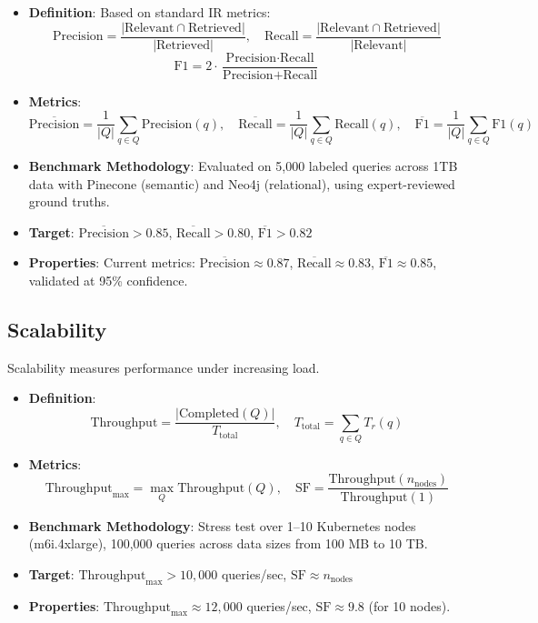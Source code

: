 \documentclass[11pt]{article}
\begin{document}
\begin{itemize}
    \item \textbf{Definition}: Based on standard IR metrics:
        \[
        \text{Precision} = \frac{|\text{Relevant} \cap \text{Retrieved}|}{|\text{Retrieved}|}, \quad
        \text{Recall} = \frac{|\text{Relevant} \cap \text{Retrieved}|}{|\text{Relevant}|}
        \]
        \[
        \text{F1} = 2 \cdot \frac{\text{Precision} \cdot \text{Recall}}{\text{Precision} + \text{Recall}}
        \]

    \item \textbf{Metrics}:
        \[
        \overline{\text{Precision}} = \frac{1}{|Q|} \sum_{q \in Q} \text{Precision}(q), \quad
        \overline{\text{Recall}} = \frac{1}{|Q|} \sum_{q \in Q} \text{Recall}(q), \quad
        \overline{\text{F1}} = \frac{1}{|Q|} \sum_{q \in Q} \text{F1}(q)
        \]

    \item \textbf{Benchmark Methodology}: Evaluated on 5,000 labeled queries across 1TB data with Pinecone (semantic) and Neo4j (relational), using expert-reviewed ground truths.

    \item \textbf{Target}: $\overline{\text{Precision}} > 0.85$, $\overline{\text{Recall}} > 0.80$, $\overline{\text{F1}} > 0.82$

    \item \textbf{Properties}: Current metrics: $\overline{\text{Precision}} \approx 0.87$, $\overline{\text{Recall}} \approx 0.83$, $\overline{\text{F1}} \approx 0.85$, validated at 95\% confidence.
\end{itemize}

\subsection{Scalability}
\label{subsec:scalability}

Scalability measures performance under increasing load.

\begin{itemize}
    \item \textbf{Definition}:
        \[
        \text{Throughput} = \frac{|\text{Completed}(Q)|}{T_{\text{total}}}, \quad
        T_{\text{total}} = \sum_{q \in Q} T_r(q)
        \]

    \item \textbf{Metrics}:
        \[
        \text{Throughput}_{\text{max}} = \max_Q \text{Throughput}(Q), \quad
        \text{SF} = \frac{\text{Throughput}(n_{\text{nodes}})}{\text{Throughput}(1)}
        \]

    \item \textbf{Benchmark Methodology}: Stress test over 1–10 Kubernetes nodes (m6i.4xlarge), 100,000 queries across data sizes from 100 MB to 10 TB.

    \item \textbf{Target}: $\text{Throughput}_{\text{max}} > 10{,}000$ queries/sec, $\text{SF} \approx n_{\text{nodes}}$

    \item \textbf{Properties}: $\text{Throughput}_{\text{max}} \approx 12{,}000$ queries/sec, $\text{SF} \approx 9.8$ (for 10 nodes).
\end{itemize}
\end{document}
